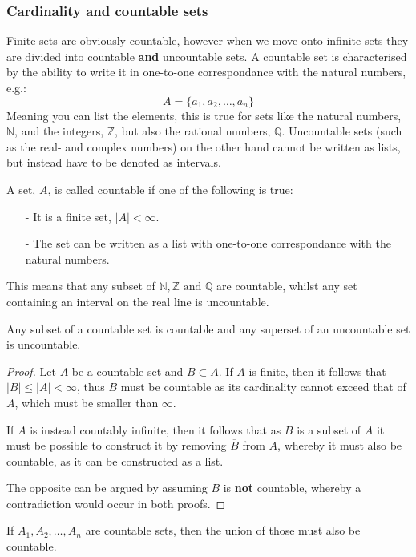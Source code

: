 \subsubsection{Cardinality and countable sets}
Finite sets are obviously countable, however when we move onto infinite sets they are divided into countable \textbf{and} uncountable sets. A countable set is characterised by the ability to write it in one-to-one correspondance with the natural numbers, e.g.:
\[
    A=\{a_1,a_2,\ldots,a_n\}
\]
Meaning you can list the elements, this is true for sets like the natural numbers, $\mathbb{N}$, and the integers, $\mathbb{Z}$, but also the rational numbers, $\mathbb{Q}$. Uncountable sets (such as the real- and complex numbers) on the other hand cannot be written as lists, but instead have to be denoted as intervals.
\begin{definition}
  A set, $A$, is called countable if one of the following is true:
  \begin{itemize}
      \item[-] It is a finite set, $|A|<\infty$.
      \item[-] The set can be written as a list with one-to-one correspondance with the natural numbers.
  \end{itemize}
\end{definition}
This means that any subset of $\mathbb{N}, \mathbb{Z} \text{ and } \mathbb{Q}$ are countable, whilst any set containing an interval on the real line is uncountable. 
\begin{theorem}
  Any subset of a countable set is countable and any superset of an uncountable set is uncountable.
\end{theorem}
\begin{proof}
  Let $A$ be a countable set and $B\subset A$. If $A$ is finite, then it follows that $|B|\leq|A|<\infty$, thus $B$ must be countable as its cardinality cannot exceed that of $A$, which must be smaller than $\infty$.

  If $A$ is instead countably infinite, then it follows that as $B$ is a subset of $A$ it must be possible to construct it by removing $\overline{B}$ from $A$, whereby it must also be countable, as it can be constructed as a list. 

  The opposite can be argued by assuming $B$ is \textbf{not} countable, whereby a contradiction would occur in both proofs.
\end{proof}
\begin{theorem}
  If $A_1,A_2,\ldots,A_n$ are countable sets, then the union of those must also be countable.
\end{theorem}
